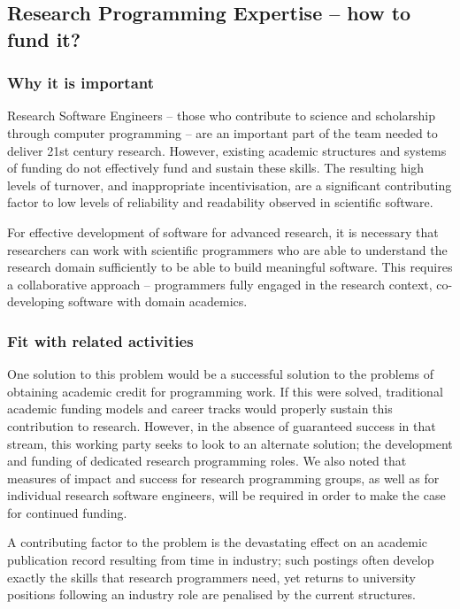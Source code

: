 \subsection{Research Programming Expertise -- how to fund it?}

\subsubsection{Why it is important}

Research Software Engineers -- those who contribute to science and scholarship
through computer programming -- are an important part of the team
needed to deliver 21st century research. However, existing academic structures
and systems of funding do not effectively fund and sustain these skills.
The resulting high levels of turnover, and inappropriate incentivisation,
are a significant contributing factor to low levels of reliability and
readability observed in scientific software.

For effective development of software for advanced research, it is necessary
that researchers can work with scientific programmers who are able to understand
the research domain sufficiently to be able to build meaningful software. This
requires a collaborative approach -- programmers fully engaged in the research
context, co-developing software with domain academics.

\subsubsection{Fit with related activities}

One solution to this problem would be a successful solution to the problems of
obtaining academic credit for programming work. If this were solved, traditional
academic funding models and career tracks would properly sustain this
contribution to research. However, in the absence of guaranteed success in that
stream, this working party seeks to look to an alternate solution; the
development and funding of dedicated research programming roles. We also noted
that measures of impact and success for research programming
groups, as well as for individual research software engineers, will be required
in order to make the case for continued funding.

A contributing factor to the problem is the devastating effect on an academic
publication record resulting from time in industry; such postings often
develop exactly the skills that research programmers need, yet returns to
university positions following an industry role are penalised by the current
structures.

